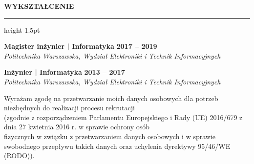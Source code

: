 \documentclass[10pt, a4paper]{article}
\newcommand{\cvsection}[1]{%
  \vspace{12pt}%
  {\color{primary}\large\bfseries\MakeUppercase{#1}}%
  \vspace{3pt}%
  {{\color{accent}\hrule height 1.5pt}}%
  \vspace{8pt}%
}
\begin{document}
\begin{minipage}[t]{0.67\textwidth}
  \cvsection{Wykształcenie}
  
  \textbf{Magister inżynier | Informatyka} \hfill {\color{accent}\textbf{2017 -- 2019}} \\
  {\color{primary}\textit{Politechnika Warszawska, Wydział Elektroniki i Technik Informacyjnych}}
  \vspace{6pt}

  \textbf{Inżynier | Informatyka} \hfill {\color{accent}\textbf{2013 -- 2017}} \\
  {\color{primary}\textit{Politechnika Warszawska, Wydział Elektroniki i Technik Informacyjnych}}

\end{minipage}

\vfill

\begin{center}
  \tiny\color{text}
  Wyrażam zgodę na przetwarzanie moich danych osobowych dla potrzeb niezbędnych do realizacji procesu rekrutacji\\
  (zgodnie z rozporządzeniem Parlamentu Europejskiego i Rady (UE) 2016/679 z dnia 27 kwietnia 2016 r. w sprawie ochrony osób\\
  fizycznych w związku z przetwarzaniem danych osobowych i w sprawie swobodnego przepływu takich danych oraz uchylenia dyrektywy 95/46/WE (RODO)).
\end{center}
\end{document}
